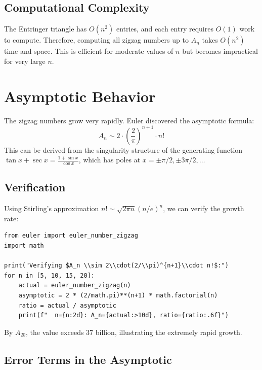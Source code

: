 \subsection{Computational Complexity}

The Entringer triangle has $O(n^2)$ entries, and each entry requires $O(1)$ work to compute.
Therefore, computing all zigzag numbers up to $A_n$ takes $O(n^2)$ time and space.
This is efficient for moderate values of $n$ but becomes impractical for very large $n$.

\section{Asymptotic Behavior}

The zigzag numbers grow very rapidly. Euler discovered the asymptotic formula:
\[
A_n \sim 2 \cdot \left(\frac{2}{\pi}\right)^{n+1} \cdot n!
\]
This can be derived from the singularity structure of the generating function
$\tan x + \sec x = \frac{1 + \sin x}{\cos x}$, which has poles at $x = \pm \pi/2, \pm 3\pi/2, \ldots$

\subsection{Verification}

Using Stirling's approximation $n! \sim \sqrt{2\pi n}(n/e)^n$, we can verify the growth rate:

\begin{lstlisting}[caption={Verifying asymptotic growth}, label=lst:asymptotic_growth]
from euler import euler_number_zigzag
import math

print("Verifying $A_n \\sim 2\\cdot(2/\\pi)^{n+1}\\cdot n!$:")
for n in [5, 10, 15, 20]:
    actual = euler_number_zigzag(n)
    asymptotic = 2 * (2/math.pi)**(n+1) * math.factorial(n)
    ratio = actual / asymptotic
    print(f"  n={n:2d}: A_n={actual:>10d}, ratio={ratio:.6f}")
\end{lstlisting}

By $A_{20}$, the value exceeds 37 billion, illustrating the extremely rapid growth.

\subsection{Error Terms in the Asymptotic}

